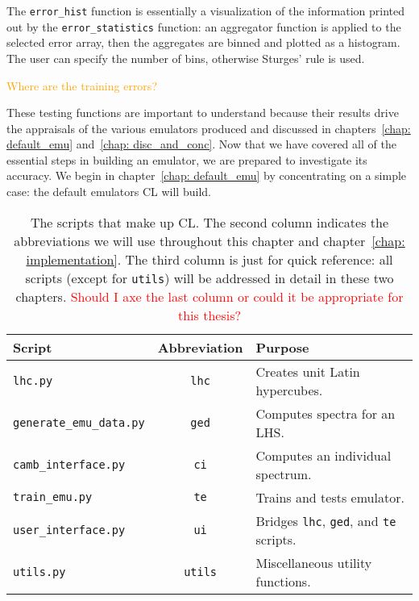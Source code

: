 The \verb|error_hist| function is essentially a visualization of the 
information printed out by the \verb|error_statistics| function: an aggregator
function is applied to the selected error array, then the aggregates are 
binned and plotted as a histogram. The user can specify the number of bins,
otherwise Sturges' rule is used.

\textcolor{orange}{Where are the training errors?}

These testing functions are important to understand because their results
drive the appraisals of the various emulators produced and discussed in
chapters~\ref{chap: default_emu} and~\ref{chap: disc_and_conc}. Now that we
have covered all of the essential steps in building an emulator, we are
prepared to investigate its accuracy. We begin in
chapter~\ref{chap: default_emu} by concentrating on a simple case: the
default emulators CL will build.


\begin{table}[ht!]
\centering
\begin{tabular}{l|c|l}
\hline
Script & Abbreviation & Purpose \\ \hline
\Verb|lhc.py| & \texttt{lhc} & Creates unit Latin hypercubes. \\
\Verb|generate_emu_data.py| & \texttt{ged} & Computes spectra for an LHS.\\
\Verb|camb_interface.py| & \texttt{ci} & Computes an individual spectrum. \\
\Verb|train_emu.py| & \texttt{te} & Trains and tests emulator. \\
\Verb|user_interface.py| & \texttt{ui} & Bridges
	\texttt{lhc}, \texttt{ged}, and \texttt{te} scripts. \\
\Verb|utils.py| & \texttt{utils} & Miscellaneous utility functions. 
\end{tabular}
 \cprotect\caption[Summary of CL Scripts]{The scripts that make up CL.
 	The second column indicates the abbreviations we will use throughout this 
 	chapter and chapter~\ref{chap: implementation}. The third column is just
 	for quick reference: all scripts (except for \texttt{utils}) will be
 	addressed in detail in these two chapters. \textcolor{red}{Should I axe
 	the last column or could it be appropriate for this thesis?}}
 \label{tab: script_summary}
\end{table}


